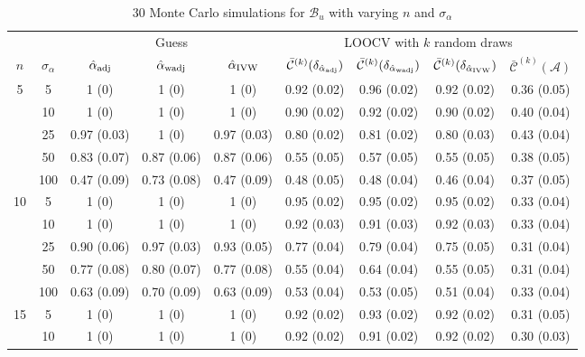 \documentclass[11pt]{article}
\def\mc#1{\mathcal{#1}} %
\theoremstyle{definition}
\begin{document}
\begin{table}[H]
\caption{30 Monte Carlo simulations  for $\mc{B}_u$ with varying $n$ and $\sigma_{\alpha}$} \vspace{.3cm} \label{table6}
\begin{center}
\begin{tabular}{cc|ccc|cccc}
   &   & \multicolumn{3}{|c|}{Guess} & \multicolumn{4}{|c}{LOOCV with $k$ random draws}  \\ 
 $n$   & $\sigma_{\alpha}$ &  $\hat{\alpha}_{\rm adj}$  & $\hat{\alpha}_{\rm wadj}$ & $\hat{\alpha}_{\rm IVW}$  & $\bar{\mc{C}}^{(k)}(\delta_{\hat{\alpha}_{\rm adj}})$  & $\bar{\mc{C}}^{(k)}(\delta_{\hat{\alpha}_{\rm wadj}})$ & $\bar{\mc{C}}^{(k)}(\delta_{\hat{\alpha}_{\rm IVW}})$ &  $\bar{\mc{C}}^{(k)}(\mc{A})$ \\[.15cm]  
  \hline
  \multirow{5}{*}{5} & 5  & 1 (0) & 1 (0) & 1 (0) & 0.92 (0.02) & 0.96 (0.02) & 0.92 (0.02) & 0.36 (0.05) \\ 
    & 10  & 1 (0) & 1 (0) & 1 (0) & 0.90 (0.02) & 0.92 (0.02) & 0.90 (0.02) & 0.40 (0.04) \\ 
    & 25  & 0.97 (0.03) & 1 (0) & 0.97 (0.03) & 0.80 (0.02) & 0.81 (0.02) & 0.80 (0.03) & 0.43 (0.04) \\ 
    & 50  & 0.83 (0.07) & 0.87 (0.06) & 0.87 (0.06) & 0.55 (0.05) & 0.57 (0.05) & 0.55 (0.05) & 0.38 (0.05) \\ 
    & 100  & 0.47 (0.09) & 0.73 (0.08) & 0.47 (0.09) & 0.48 (0.05) & 0.48 (0.04) & 0.46 (0.04) & 0.37 (0.05) \\[.3cm] 
    \multirow{5}{*}{10} & 5  & 1 (0) & 1 (0) & 1 (0) & 0.95 (0.02) & 0.95 (0.02) & 0.95 (0.02) & 0.33 (0.04) \\ 
    & 10  & 1 (0) & 1 (0) & 1 (0) & 0.92 (0.03) & 0.91 (0.03) & 0.92 (0.03) & 0.33 (0.04) \\ 
    & 25  & 0.90 (0.06) & 0.97 (0.03) & 0.93 (0.05) & 0.77 (0.04) & 0.79 (0.04) & 0.75 (0.05) & 0.31 (0.04) \\ 
    & 50  & 0.77 (0.08) & 0.80 (0.07) & 0.77 (0.08) & 0.55 (0.04) & 0.64 (0.04) & 0.55 (0.05) & 0.31 (0.04) \\ 
    & 100  & 0.63 (0.09) & 0.70 (0.09) & 0.63 (0.09) & 0.53 (0.04) & 0.53 (0.05) & 0.51 (0.04) & 0.33 (0.04) \\[.3cm] 
    \multirow{5}{*}{15} & 5  & 1 (0) & 1 (0) & 1 (0) & 0.92 (0.02) & 0.93 (0.02) & 0.92 (0.02) & 0.31 (0.05) \\ 
    & 10  & 1 (0) & 1 (0) & 1 (0) & 0.92 (0.02) & 0.91 (0.02) & 0.92 (0.02) & 0.30 (0.03) \\ 

\end{tabular}
\end{center}
\end{table}
\end{document}
